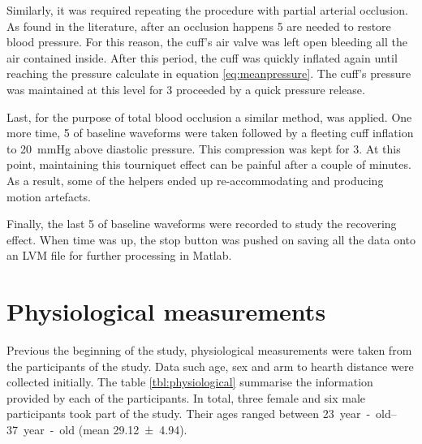 Similarly, it was required repeating the procedure with partial arterial occlusion. As found in the literature, after an occlusion happens \SI{5}{\min} are needed to restore blood pressure. For this reason, the cuff's air valve was left open bleeding all the air contained inside. After this period, the cuff was quickly inflated again until reaching the pressure calculate in equation \ref{eq:meanpressure}. The cuff's pressure was maintained at this level for \SI{3}{\min} proceeded by a quick pressure release. 

Last, for the purpose of total blood occlusion a similar method, was applied. One more time, \SI{5}{\min} of baseline waveforms were taken followed by a fleeting cuff inflation to \SI{20}{\mmHg} above diastolic pressure. This compression was kept for \SI{3}{\min}. At this point, maintaining this tourniquet effect can be painful after a couple of minutes. As a result, some of the helpers ended up re-accommodating and producing motion artefacts. 

Finally, the last \SI{5}{\min} of baseline waveforms were recorded to study the recovering effect. When time was up, the stop button was pushed on saving all the data onto an LVM file for further processing in Matlab. 

\section{Physiological measurements}
\label{section procedure 2}
Previous the beginning of the study, physiological measurements were taken from the participants of the study. Data such age, sex and arm to hearth distance were collected initially. The table \ref{tbl:physiological} summarise the information provided by each of the participants. In total, three female and six male participants took part of the study. Their ages ranged between \SIrange{23}{37}{year-old} (mean \num{29.12(494)}). 

